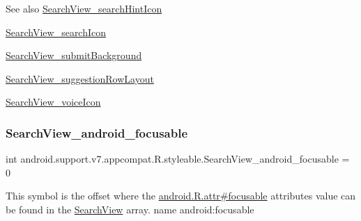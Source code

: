 \begin{DoxySeeAlso}{See also}
\hyperlink{classandroid_1_1support_1_1v7_1_1appcompat_1_1R_1_1styleable_a2794d77a4ddac9ee228c28d219ff6b31}{Search\+View\+\_\+search\+Hint\+Icon} 

\hyperlink{classandroid_1_1support_1_1v7_1_1appcompat_1_1R_1_1styleable_a8e6e122f919effcc0243ea3cc6d47524}{Search\+View\+\_\+search\+Icon} 

\hyperlink{classandroid_1_1support_1_1v7_1_1appcompat_1_1R_1_1styleable_a7d61d4e0aeb32c5c70b0aabb85cf4eb6}{Search\+View\+\_\+submit\+Background} 

\hyperlink{classandroid_1_1support_1_1v7_1_1appcompat_1_1R_1_1styleable_a721bc13b98ace8002519af52fdaf8a26}{Search\+View\+\_\+suggestion\+Row\+Layout} 

\hyperlink{classandroid_1_1support_1_1v7_1_1appcompat_1_1R_1_1styleable_ab659f692825b4cff1b7e0b64a992de3d}{Search\+View\+\_\+voice\+Icon} 
\end{DoxySeeAlso}
\mbox{\label{classandroid_1_1support_1_1v7_1_1appcompat_1_1R_1_1styleable_aafdb0651b761f7d79703c2cbdb007eec}} 
\subsubsection{\texorpdfstring{Search\+View\+\_\+android\+\_\+focusable}{SearchView\_android\_focusable}}
{\footnotesize\ttfamily int android.\+support.\+v7.\+appcompat.\+R.\+styleable.\+Search\+View\+\_\+android\+\_\+focusable = 0\hspace{0.3cm}{\ttfamily [static]}}

This symbol is the offset where the \hyperlink{}{android.\+R.\+attr\#focusable} attribute\textquotesingle{}s value can be found in the \hyperlink{classandroid_1_1support_1_1v7_1_1appcompat_1_1R_1_1styleable_a01af09df9e38f1e4f57165c3d3cee9fe}{Search\+View} array.  name android\+:focusable \mbox{\label{classandroid_1_1support_1_1v7_1_1appcompat_1_1R_1_1styleable_a532203151aa88d8386a459a3c5a7a355}} 
